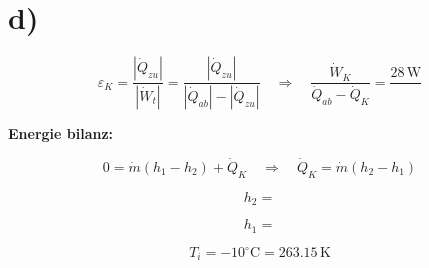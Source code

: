 

\section*{d)}

\[
\varepsilon_K = \frac{|\dot{Q}_{zu}|}{|\dot{W}_t|} = \frac{|\dot{Q}_{zu}|}{|\dot{Q}_{ab}| - |\dot{Q}_{zu}|} \quad \Rightarrow \quad \frac{\dot{W}_K}{\dot{Q}_{ab} - \dot{Q}_K} = \frac{28 \, \text{W}}{}
\]

\textbf{Energie bilanz:}

\[
0 = \dot{m} (h_1 - h_2) + \dot{Q}_K \quad \Rightarrow \quad \dot{Q}_K = \dot{m} (h_2 - h_1)
\]

\[
h_2 = 
\]

\[
h_1 = 
\]

\[
T_i = -10^\circ \text{C} = 263.15 \, \text{K}
\]